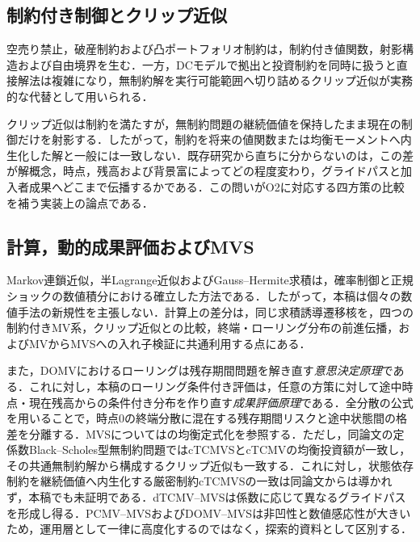\documentclass[10pt,a4paper]{article}
\theoremstyle{plain}
\theoremstyle{definition}
\begin{document}
\subsection{制約付き制御とクリップ近似}

空売り禁止，破産制約および凸ポートフォリオ制約は，制約付き値関数，射影構造および自由境界を生む\citep{LiZhouLim2002,LiXu2015,BensoussanWongYamYung2014,GuanLiZhouZhou2022}．一方，DCモデルで拠出と投資制約を同時に扱うと直接解法は複雑になり，無制約解を実行可能範囲へ切り詰めるクリップ近似が実務的な代替として用いられる\citep{DiGiacintoFedericoGozziVigna2014,FerreiraMoriciVigna2025}．

クリップ近似は制約を満たすが，無制約問題の継続価値を保持したまま現在の制御だけを射影する．したがって，制約を将来の値関数または均衡モーメントへ内生化した解と一般には一致しない．既存研究から直ちに分からないのは，この差が解概念，時点，残高および背景富によってどの程度変わり，グライドパスと加入者成果へどこまで伝播するかである．この問いがO2に対応する四方策の比較を補う実装上の論点である．

\subsection{計算，動的成果評価およびMVS}

Markov連鎖近似，半Lagrange近似およびGauss--Hermite求積は，確率制御と正規ショックの数値積分における確立した方法である\citep{KushnerDupuis2001,FalconeFerretti2014,AbramowitzStegun1972,Judd1998}．したがって，本稿は個々の数値手法の新規性を主張しない．計算上の差分は，同じ求積誘導遷移核を，四つの制約付きMV系，クリップ近似との比較，終端・ローリング分布の前進伝播，およびMVからMVSへの入れ子検証に共通利用する点にある．

また，DOMVにおけるローリングは残存期間問題を解き直す\emph{意思決定原理}である．これに対し，本稿のローリング条件付き評価は，任意の方策に対して途中時点・現在残高からの条件付き分布を作り直す\emph{成果評価原理}である．全分散の公式を用いることで，時点0の終端分散に混在する残存期間リスクと途中状態間の格差を分離する．MVSについては\citet{MuTianYang2019}の均衡定式化を参照する．ただし，同論文の定係数Black--Scholes型無制約問題ではcTCMVSとcTCMVの均衡投資額が一致し，その共通無制約解から構成するクリップ近似も一致する．これに対し，状態依存制約を継続価値へ内生化する厳密制約cTCMVSの一致は同論文からは導かれず，本稿でも未証明である．dTCMV--MVSは係数に応じて異なるグライドパスを形成し得る．PCMV--MVSおよびDOMV--MVSは非凹性と数値感応性が大きいため，運用層として一律に高度化するのではなく，探索的資料として区別する．
\end{document}
